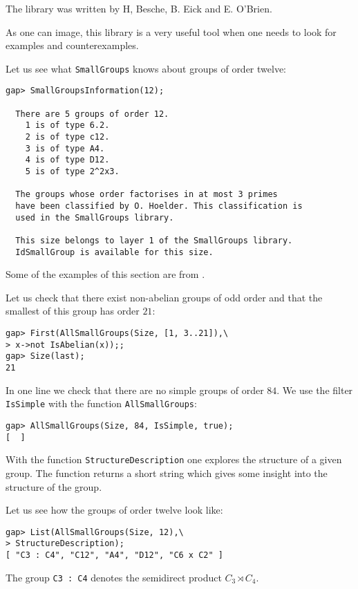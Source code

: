 The library was written by H, Besche, B. Eick and E. O'Brien. 

As one can image, this library is a very useful tool when one needs to look for
examples and counterexamples.  

\begin{example}
Let us see what \lstinline{SmallGroups} knows about groups of order twelve:
\begin{lstlisting}
gap> SmallGroupsInformation(12);                                      

  There are 5 groups of order 12.
    1 is of type 6.2.
    2 is of type c12.
    3 is of type A4.
    4 is of type D12.
    5 is of type 2^2x3.

  The groups whose order factorises in at most 3 primes 
  have been classified by O. Hoelder. This classification is 
  used in the SmallGroups library. 

  This size belongs to layer 1 of the SmallGroups library. 
  IdSmallGroup is available for this size. 
\end{lstlisting}
\end{example}

Some of the examples of this section are from \cite{MR605275}. 

\begin{example}
	Let us check that there exist non-abelian groups of odd order and that the
	smallest of this group has order $21$:
\begin{lstlisting}
gap> First(AllSmallGroups(Size, [1, 3..21]),\
> x->not IsAbelian(x));;
gap> Size(last);
21
\end{lstlisting}
\end{example}

\begin{example}
In one line we check that there are no simple groups of order $84$. We use 
the filter \lstinline{IsSimple} with the function 
\lstinline{AllSmallGroups}:
\begin{lstlisting}
gap> AllSmallGroups(Size, 84, IsSimple, true);
[  ]
\end{lstlisting}
\end{example}

With the function \lstinline{StructureDescription} one explores the structure
of a given group. The function returns a short string which gives some insight
into the structure of the group.  

\begin{example}
Let us see how the groups of order twelve look like:
\begin{lstlisting}
gap> List(AllSmallGroups(Size, 12),\
> StructureDescription);
[ "C3 : C4", "C12", "A4", "D12", "C6 x C2" ]
\end{lstlisting}
The group \lstinline{C3 : C4} denotes the semidirect product 
$C_3\rtimes C_4$. 
\end{example}

